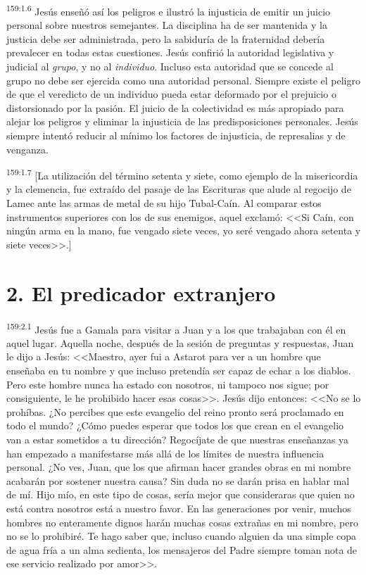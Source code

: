 \par 
\textsuperscript{159:1.6} Jesús enseñó así los peligros e ilustró la injusticia de emitir un juicio personal sobre nuestros semejantes. La disciplina ha de ser mantenida y la justicia debe ser administrada, pero la sabiduría de la fraternidad debería prevalecer en todas estas cuestiones. Jesús confirió la autoridad legislativa y judicial al \textit{grupo}, y no al \textit{individuo}. Incluso esta autoridad que se concede al grupo no debe ser ejercida como una autoridad personal. Siempre existe el peligro de que el veredicto de un individuo pueda estar deformado por el prejuicio o distorsionado por la pasión. El juicio de la colectividad es más apropiado para alejar los peligros y eliminar la injusticia de las predisposiciones personales. Jesús siempre intentó reducir al mínimo los factores de injusticia, de represalias y de venganza.

\par 
\textsuperscript{159:1.7} [La utilización del término setenta y siete, como ejemplo de la misericordia y la clemencia, fue extraído del pasaje de las Escrituras que alude al regocijo de Lamec ante las armas de metal de su hijo Tubal-Caín. Al comparar estos instrumentos superiores con los de sus enemigos, aquel exclamó: <<Si Caín, con ningún arma en la mano, fue vengado siete veces, yo seré vengado ahora setenta y siete veces>>.]

\section*{2. El predicador extranjero}
\par 
\textsuperscript{159:2.1} Jesús fue a Gamala para visitar a Juan y a los que trabajaban con él en aquel lugar. Aquella noche, después de la sesión de preguntas y respuestas, Juan le dijo a Jesús: <<Maestro, ayer fui a Astarot para ver a un hombre que enseñaba en tu nombre y que incluso pretendía ser capaz de echar a los diablos. Pero este hombre nunca ha estado con nosotros, ni tampoco nos sigue; por consiguiente, le he prohibido hacer esas cosas>>. Jesús dijo entonces: <<No se lo prohíbas. ¿No percibes que este evangelio del reino pronto será proclamado en todo el mundo? ¿Cómo puedes esperar que todos los que crean en el evangelio van a estar sometidos a tu dirección? Regocíjate de que nuestras enseñanzas ya han empezado a manifestarse más allá de los límites de nuestra influencia personal. ¿No ves, Juan, que los que afirman hacer grandes obras en mi nombre acabarán por sostener nuestra causa? Sin duda no se darán prisa en hablar mal de mí. Hijo mío, en este tipo de cosas, sería mejor que consideraras que quien no está contra nosotros está a nuestro favor. En las generaciones por venir, muchos hombres no enteramente dignos harán muchas cosas extrañas en mi nombre, pero no se lo prohibiré. Te hago saber que, incluso cuando alguien da una simple copa de agua fría a un alma sedienta, los mensajeros del Padre siempre toman nota de ese servicio realizado por amor>>.

